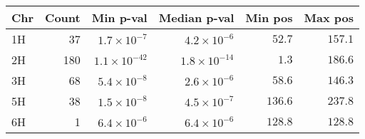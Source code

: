 \begin{longtable}{lrrrrr}
\toprule
Chr & Count & Min p-val & Median p-val & Min pos & Max pos \\ 
\midrule\addlinespace[2.5pt]
1H & 37 & $1.7 \times 10^{-7}$ & $4.2 \times 10^{-6}$ & $52.7$ & $157.1$ \\ 
2H & 180 & $1.1 \times 10^{-42}$ & $1.8 \times 10^{-14}$ & $1.3$ & $186.6$ \\ 
3H & 68 & $5.4 \times 10^{-8}$ & $2.6 \times 10^{-6}$ & $58.6$ & $146.3$ \\ 
5H & 38 & $1.5 \times 10^{-8}$ & $4.5 \times 10^{-7}$ & $136.6$ & $237.8$ \\ 
6H & 1 & $6.4 \times 10^{-6}$ & $6.4 \times 10^{-6}$ & $128.8$ & $128.8$ \\ 
\bottomrule
\end{longtable}


